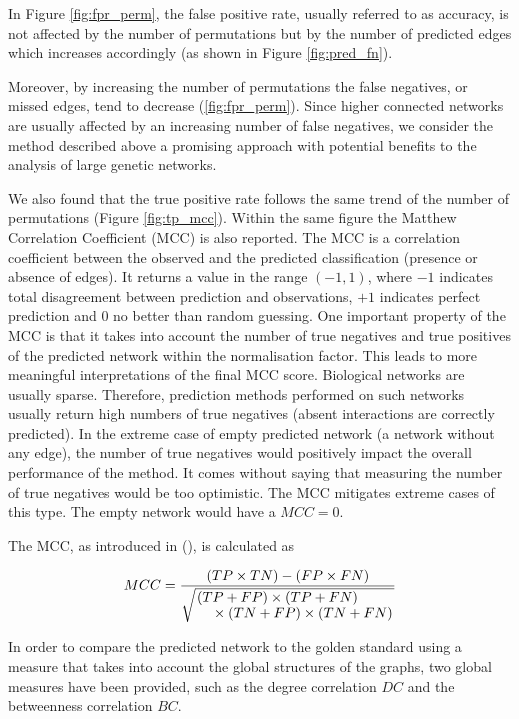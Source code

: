In Figure \ref{fig:fpr_perm}, the false positive rate, usually referred to as accuracy, is not affected by the number of permutations but by the number of predicted edges which increases accordingly (as shown in Figure \ref{fig:pred_fn}). 

Moreover, by increasing the number of permutations the false negatives, or missed edges, tend to decrease (\ref{fig:fpr_perm}). Since higher connected networks are usually affected by an increasing number of false negatives, we consider the method described above a promising approach with potential benefits to the analysis of large genetic networks. 

We also found that the true positive rate follows the same trend of the number of permutations (Figure \ref{fig:tp_mcc}). Within the same figure the Matthew Correlation Coefficient (MCC) is also reported. The MCC is a correlation coefficient between the observed and the predicted classification (presence or absence of edges). It returns a value in the range $(-1, 1)$, where $-1$ indicates total disagreement between prediction and observations, $+1$ indicates perfect prediction and $0$ no better than random guessing.
One important property of the MCC is that it takes into account the number of true negatives and true positives of the predicted network within the normalisation factor. This leads to more meaningful interpretations of the final MCC score. Biological networks are usually sparse. Therefore, prediction methods performed on such networks usually return high numbers of true negatives (absent interactions are correctly predicted). 
In the extreme case of empty predicted network (a network without any edge), the number of true negatives would positively impact the overall performance of the method. It comes without saying that measuring the number of true negatives would be too optimistic. The MCC mitigates extreme cases of this type. The empty network would have a $MCC = 0$. 

The MCC, as introduced in (\citealp{Matthews1975}), is calculated as 

\begin{equation}
MCC = \frac{(TP \times TN) - (FP \times FN)}{\sqrt{\splitfrac{(TP+FP)\times(TP+FN)}{
\times(TN+FP)\times(TN+FN)} }}
\label{eq:mcc}
\end{equation}

In order to compare the predicted network to the golden standard using a measure that takes into account the global structures of the graphs, two global measures have been provided, such as the degree correlation $DC$ and the betweenness correlation $BC$.
 

